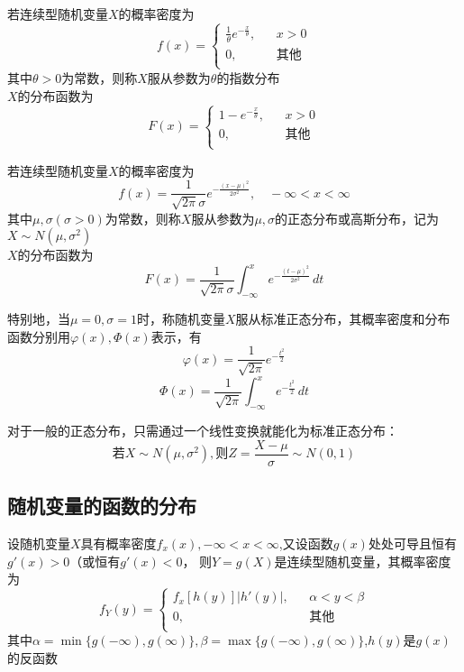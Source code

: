 \begin{definition}[指数分布]
    若连续型随机变量$X$的概率密度为
    $$ f(x)=\left\{
        \begin{array}{lll}
        \frac{1}{\theta}e^{-\frac{x}{\theta}}, &  & x>0\\
        0,&  &  \mbox{其他} \\
        \end{array}\right. $$
    其中$\theta>0$为常数，则称$X$服从参数为$\theta$的指数分布\\
    $X$的分布函数为
    $$ F(x)=\left\{
        \begin{array}{lll}
        1-e^{-\frac{x}{\theta}}, &  &x>0\\
        0,&  &  \mbox{其他} \\
        \end{array}\right. $$
\end{definition}

\begin{definition}[正态分布]
    若连续型随机变量$X$的概率密度为
    $$f(x)=\frac{1}{\sqrt{2\pi}\sigma}e^{-\frac{{(x-\mu)}^2}{2\sigma^2}}, \quad -\infty<x<\infty$$
    其中$\mu,\sigma(\sigma>0)$为常数，则称$X$服从参数为$\mu,\sigma$的正态分布或高斯分布，记为$X\sim N(\mu,\sigma^2)$\\
    $X$的分布函数为
    $$F(x)=\frac{1}{\sqrt{2\pi}\sigma}\int_{-\infty}^{x} e^{-\frac{{(t-\mu)}^2}{2\sigma^2}} \,dt $$

    特别地，当$\mu=0,\sigma=1$时，称随机变量$X$服从{\heiti 标准正态分布}，其概率密度和分布函数分别用$\varphi(x),\varPhi(x)$表示，有
    $$ \varphi(x)=\frac{1}{\sqrt{2\pi}}e^{-\frac{t^2}{2}}$$
    $$ \varPhi(x)=\frac{1}{\sqrt{2\pi}}\int_{-\infty}^x e^{-\frac{t^2}{2}} \,dt$$

    对于一般的正态分布，只需通过一个线性变换就能化为标准正态分布：
    $$\mbox{若}X\sim N(\mu,\sigma^2),\mbox{则}Z=\frac{X-\mu}{\sigma}\sim N(0,1)$$
\end{definition}

\subsection{随机变量的函数的分布}
\begin{theorem}
    设随机变量$X$具有概率密度$f_x(x),-\infty<x<\infty$,又设函数$g(x)$处处可导且恒有$g'(x)>0$（或恒有$g'(x)<0$，
    则$Y=g(X)$是连续型随机变量，其概率密度为
    $$f_Y(y)=\left\{
        \begin{array}{lll}
        f_x[h(y)]|h'(y)|, &  &\alpha<y<\beta\\
        0,&  &  \mbox{其他} \\
        \end{array}\right. $$
    其中$\alpha=\min\{g(-\infty),g(\infty)\},\beta=\max\{g(-\infty),g(\infty)\}$,$h(y)$是$g(x)$的反函数
\end{theorem}